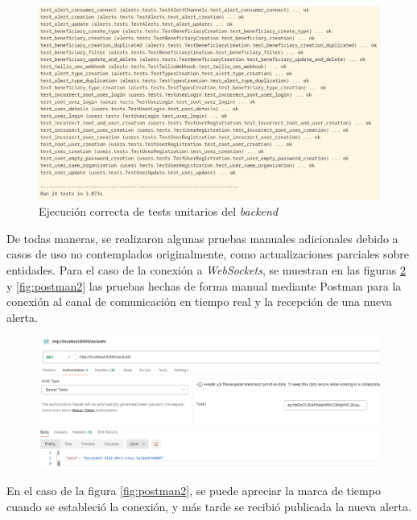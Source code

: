 \begin{figure}[H]
	\centering
	\includegraphics[width=1\textwidth]{./Figures/tests-unitarios.png}
	\caption{Ejecución correcta de tests unitarios del \textit{backend}}
	\label{fig:tests-unitarios}
\end{figure}

De todas maneras, se realizaron algunas pruebas manuales adicionales debido a casos de uso no contemplados originalmente, como actualizaciones parciales sobre entidades. Para el caso de la conexión a \textit{WebSockets}, se muestran en las figuras \ref{fig:postman1} y \ref{fig:postman2} las pruebas hechas de forma manual mediante Postman para la conexión al canal de comunicación en tiempo real y la recepción de una nueva alerta. 

\begin{figure}[H]
	\centering
  	\includegraphics[width=1\linewidth]{./Figures/postman1.png}
  	\label{fig:postman1}
\end{figure}

En el caso de la figura \ref{fig:postman2}, se puede apreciar la marca de tiempo cuando se estableció la conexión, y más tarde se recibió publicada la nueva alerta.

